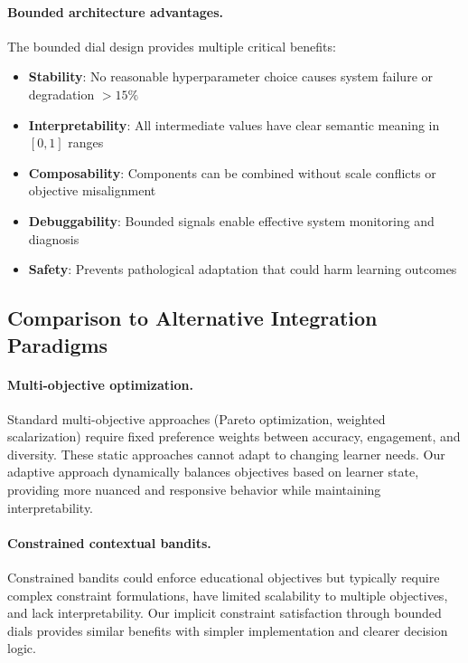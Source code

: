 \paragraph{Bounded architecture advantages.} The bounded dial design provides multiple critical benefits:
\begin{itemize}
  \item \textbf{Stability}: No reasonable hyperparameter choice causes system failure or degradation $> 15\%$
  \item \textbf{Interpretability}: All intermediate values have clear semantic meaning in $[0,1]$ ranges
  \item \textbf{Composability}: Components can be combined without scale conflicts or objective misalignment
  \item \textbf{Debuggability}: Bounded signals enable effective system monitoring and diagnosis
  \item \textbf{Safety}: Prevents pathological adaptation that could harm learning outcomes
\end{itemize}

\subsection{Comparison to Alternative Integration Paradigms}
\label{app:integration-alternatives}

\paragraph{Multi-objective optimization.} Standard multi-objective approaches (Pareto optimization, weighted scalarization) require fixed preference weights between accuracy, engagement, and diversity. These static approaches cannot adapt to changing learner needs. Our adaptive approach dynamically balances objectives based on learner state, providing more nuanced and responsive behavior while maintaining interpretability.

\paragraph{Constrained contextual bandits.} Constrained bandits could enforce educational objectives but typically require complex constraint formulations, have limited scalability to multiple objectives, and lack interpretability. Our implicit constraint satisfaction through bounded dials provides similar benefits with simpler implementation and clearer decision logic.

